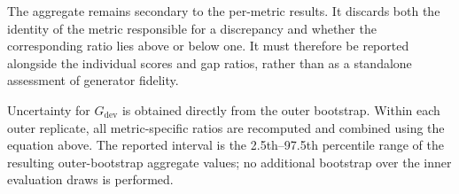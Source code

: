 The aggregate remains secondary to the per-metric results.
It discards both the identity of the metric responsible for a discrepancy
and whether the corresponding ratio lies above or below one.
It must therefore be reported alongside the individual scores and gap ratios,
rather than as a standalone assessment of generator fidelity.

Uncertainty for $G_{\mathrm{dev}}$ is obtained directly from the outer
bootstrap.
Within each outer replicate, all metric-specific ratios are recomputed and
combined using the equation above.
The reported interval is the 2.5th--97.5th percentile range of the resulting
outer-bootstrap aggregate values; no additional bootstrap over the inner
evaluation draws is performed.
